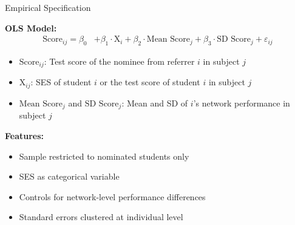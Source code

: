 \documentclass[aspectratio=169,xcolor=dvipsnames]{beamer}
\begin{document}
\begin{frame}{Empirical Specification}
    
    \vspace{0.5em}
    \textbf{OLS Model:}
    \begin{align*}
        \text{Score}_{ij} = \beta_0 &+ \beta_1 \cdot \text{X}_i + \beta_2 \cdot \text{Mean Score}_j + \beta_3 \cdot \text{SD Score}_j + \varepsilon_{ij}
    \end{align*}
    
    \vspace{0.5em}
    \begin{itemize}
        \item $\text{Score}_{ij}$: Test score of the nominee from referrer $i$ in subject $j$
        \item $\text{X}_{ij}$: SES of student $i$ or the test score of student $i$ in subject $j$
        \item $\text{Mean Score}_j$ and $\text{SD Score}_j$: Mean and SD of $i$'s network performance in subject $j$
    \end{itemize}
    
    \vspace{0.5em}
    \textbf{Features:}
    \begin{itemize}
        \item Sample restricted to nominated students only
        \item SES as categorical variable
        \item Controls for network-level performance differences
        \item Standard errors clustered at individual level
    \end{itemize}
\end{frame}
\end{document}
